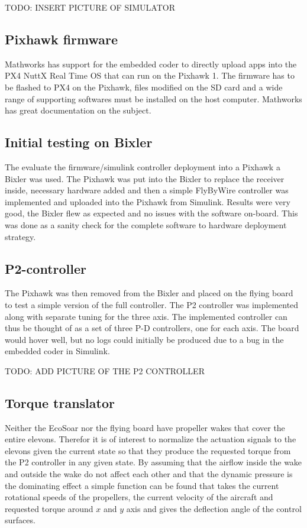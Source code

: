 \documentclass{article}
\begin{document}
TODO: INSERT PICTURE OF SIMULATOR

\subsection{Pixhawk firmware}
Mathworks has support for the embedded coder to directly upload apps into the PX4 NuttX Real Time OS that can run on the Pixhawk 1.
The firmware has to be flashed to PX4 on the Pixhawk, files modified on the SD card and a wide range of supporting softwares must be installed on the host computer.
Mathworks has great documentation on the subject.\cite{MathworksPX4}

\subsection{Initial testing on Bixler}
The evaluate the firmware/simulink controller deployment into a Pixhawk a Bixler was used.
The Pixhawk was put into the Bixler to replace the receiver inside, necessary hardware added and then a simple FlyByWire controller was implemented and uploaded into the Pixhawk from Simulink.
Results were very good, the Bixler flew as expected and no issues with the software on-board.
This was done as a sanity check for the complete software to hardware deployment strategy.


\subsection{P2-controller}
The Pixhawk was then removed from the Bixler and placed on the flying board to test a simple version of the full controller.
The P2 controller \cite{P2} was implemented along with separate tuning for the three axis.
The implemented controller can thus be thought of as a set of three P-D controllers, one for each axis.
The board would hover well, but no logs could initially be produced due to a bug in the embedded coder in Simulink.

TODO: ADD PICTURE OF THE P2 CONTROLLER


\subsection{Torque translator}
Neither the EcoSoar nor the flying board have propeller wakes that cover the entire elevons.
Therefor it is of interest to normalize the actuation signals to the elevons given the current state so that they produce the requested torque from the P2 controller in any given state.
By assuming that the airflow inside the wake and outside the wake do not affect each other and that the dynamic pressure is the dominating effect a simple function can be found that takes the current rotational speeds of the propellers, the current velocity of the aircraft and requested torque around $x$ and $y$ axis and gives the deflection angle of the control surfaces.
\end{document}
